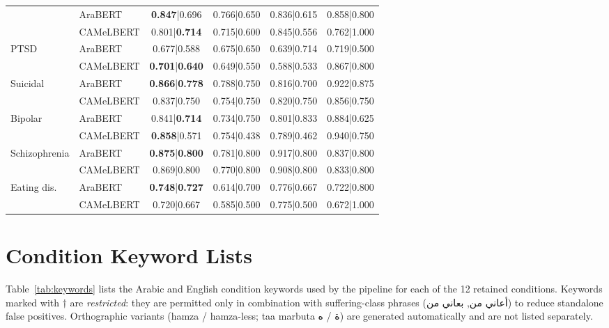 \documentclass[letterpaper]{article} %
\begin{document}
\begin{table}[t]
\begin{tabular}{llcccc}
 & AraBERT & \textbf{0.847}|0.696 & 0.766|0.650 & 0.836|0.615 & 0.858|0.800 \\
 & CAMeLBERT & 0.801|\textbf{0.714} & 0.715|0.600 & 0.845|0.556 & 0.762|1.000 \\
\midrule
\multirow{2}{*}{PTSD}
 & AraBERT & 0.677|0.588 & 0.675|0.650 & 0.639|0.714 & 0.719|0.500 \\
 & CAMeLBERT & \textbf{0.701}|\textbf{0.640} & 0.649|0.550 & 0.588|0.533 & 0.867|0.800 \\
\midrule
\multirow{2}{*}{Suicidal}
 & AraBERT & \textbf{0.866}|\textbf{0.778} & 0.788|0.750 & 0.816|0.700 & 0.922|0.875 \\
 & CAMeLBERT & 0.837|0.750 & 0.754|0.750 & 0.820|0.750 & 0.856|0.750 \\
\midrule
\multirow{2}{*}{Bipolar}
 & AraBERT & 0.841|\textbf{0.714} & 0.734|0.750 & 0.801|0.833 & 0.884|0.625 \\
 & CAMeLBERT & \textbf{0.858}|0.571 & 0.754|0.438 & 0.789|0.462 & 0.940|0.750 \\
\midrule
\multirow{2}{*}{Schizophrenia}
 & AraBERT & \textbf{0.875}|\textbf{0.800} & 0.781|0.800 & 0.917|0.800 & 0.837|0.800 \\
 & CAMeLBERT & 0.869|0.800 & 0.770|0.800 & 0.908|0.800 & 0.833|0.800 \\
\midrule
\multirow{2}{*}{Eating dis.}
 & AraBERT & \textbf{0.748}|\textbf{0.727} & 0.614|0.700 & 0.776|0.667 & 0.722|0.800 \\
 & CAMeLBERT & 0.720|0.667 & 0.585|0.500 & 0.775|0.500 & 0.672|1.000 \\
\bottomrule
\end{tabular}
\end{table}

\section{Condition Keyword Lists}
\label{app:keywords}

Table~\ref{tab:keywords} lists the Arabic and English condition
keywords used by the pipeline for each of the 12 retained conditions.
Keywords marked with $\dagger$ are \textit{restricted}: they are
permitted only in combination with suffering-class phrases
(\foreignlanguage{arabic}{أعاني من}, \foreignlanguage{arabic}{بعاني من})
to reduce standalone false positives. Orthographic variants (hamza /
hamza-less; taa marbuta \foreignlanguage{arabic}{ة} /
\foreignlanguage{arabic}{ه}) are generated automatically and are not
listed separately.
\end{document}
